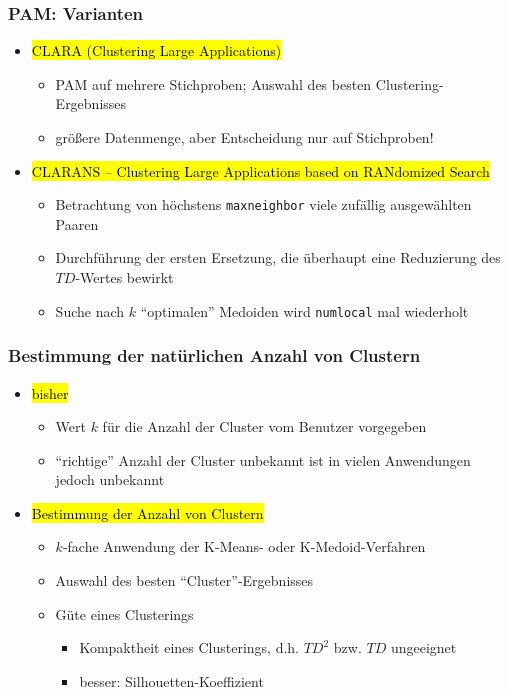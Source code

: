 \begin{frame}
\frametitle{PAM: Varianten}

\begin{itemize}
\item\hl{CLARA (Clustering Large Applications)}
\begin{itemize}
\item PAM auf mehrere Stichproben; Auswahl des besten Clustering-Ergebnisses
\item größere Datenmenge, aber Entscheidung nur auf Stichproben!
\end{itemize}
\item\hl{CLARANS -- Clustering Large Applications based on RANdomized Search}
\begin{itemize}
\item Betrachtung von höchstens \texttt{maxneighbor} viele zufällig ausgewählten
  Paaren
\item Durchführung der ersten Ersetzung, die überhaupt eine
  Reduzierung des $TD$-Wertes bewirkt
\item Suche nach $k$ "`optimalen"' Medoiden wird \texttt{numlocal} mal wiederholt
\end{itemize}
\end{itemize}

\end{frame}



\begin{frame}
\frametitle{Bestimmung der natürlichen Anzahl von Clustern}

\begin{itemize}
\item \hl{bisher}
\begin{itemize}
\item Wert $k$ für die Anzahl der Cluster vom Benutzer vorgegeben
\item "`richtige"' Anzahl der Cluster unbekannt ist in vielen
  Anwendungen jedoch unbekannt
\end{itemize}
\item \hl{Bestimmung der Anzahl von Clustern}
\begin{itemize}
\item $k$-fache Anwendung der K-Means- oder K-Medoid-Verfahren
\item Auswahl des besten "`Cluster"'-Ergebnisses
\item Güte eines Clusterings
\begin{itemize}
\item Kompaktheit eines Clusterings, d.h. $TD^2$ bzw. $TD$ ungeeignet
\item besser: Silhouetten-Koeffizient
\end{itemize}
\end{itemize}
\end{itemize}

\end{frame}

